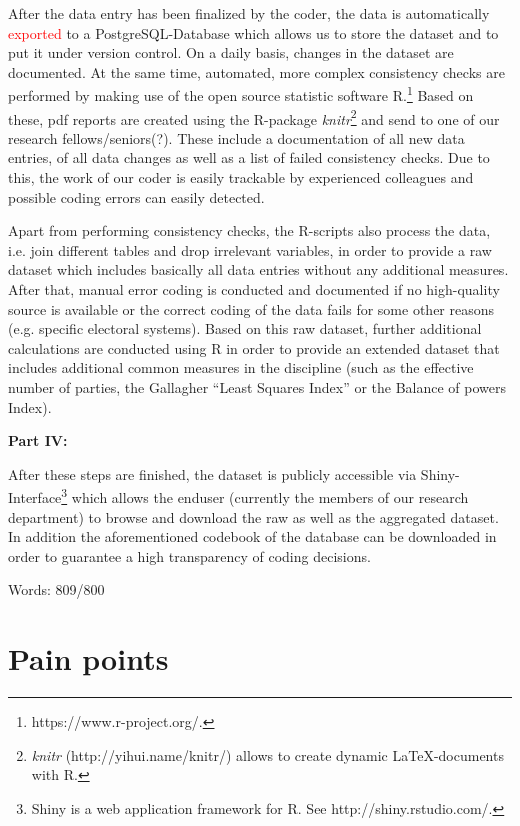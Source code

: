\documentclass[
  11pt
]{article}
\begin{document}
After the data entry has been finalized by the coder, the data is automatically \textcolor{red}{exported} to a PostgreSQL-Database which allows us to store the dataset and to put it under version control. On a daily basis, changes in the dataset are documented. At the same time, automated, more complex consistency checks are performed by making use of the open source statistic software R.\footnote{https://www.r-project.org/.} Based on these, pdf reports are created using the R-package \textit{knitr}\footnote{\textit{knitr} (http://yihui.name/knitr/) allows to create dynamic \LaTeX-documents with R.} and send to one of our research fellows/seniors(?). These include a documentation of all new data entries, of all data changes as well as a list of failed consistency checks. Due to this, the work of our coder is easily trackable by experienced colleagues and possible coding errors can easily detected.

Apart from performing consistency checks, the R-scripts also process the data, i.e. join different tables and drop irrelevant variables, in order to provide a raw dataset which includes basically all data entries without any additional measures. After that, manual error coding is conducted and documented if no high-quality source is available or the correct coding of the data fails for some other reasons (e.g. specific electoral systems). Based on this raw dataset, further additional calculations are conducted using R in order to provide an extended dataset that includes additional common measures in the discipline (such as the effective number of parties, the Gallagher “Least Squares Index” or the Balance of powers Index).

\textbf{Part IV:}

After these steps are finished, the dataset is publicly accessible via Shiny-Interface\footnote{Shiny is a web application framework for R. See http://shiny.rstudio.com/.} which allows the enduser (currently the members of our research department) to browse and download the raw as well as the aggregated dataset. In addition the aforementioned codebook of the database can be downloaded in order to guarantee a high transparency of coding decisions.

\vspace*{1cm}

\noindent
Words: 809/800

\section{Pain points}
\end{document}
